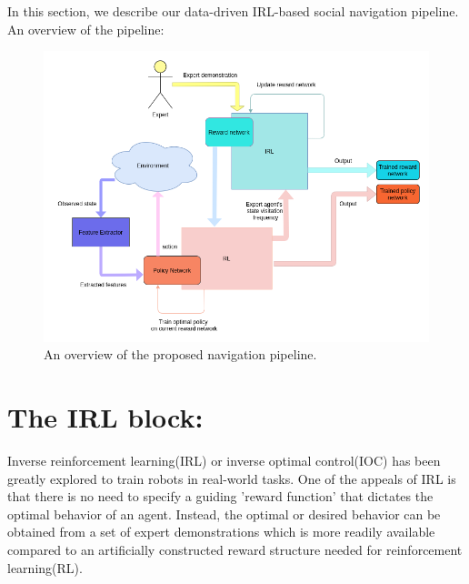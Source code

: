 \label{Ch:4}
In this section, we describe our data-driven IRL-based social navigation pipeline.\\
An overview of the pipeline:

\begin{figure}
	\centering
	\includegraphics[width=\linewidth]{figures/irl_pipeline.png}
	\caption{An overview of the proposed navigation pipeline.}
	\label{fig:irl_pipeline}
\end{figure}

\section{The IRL block:}
Inverse reinforcement learning(IRL) or inverse optimal control(IOC) has been greatly explored to train robots in real-world tasks. One of the appeals of IRL is that there is no need to specify a guiding 'reward function' that dictates the optimal behavior of an agent. Instead, the optimal or desired behavior can be obtained from a set of expert demonstrations which is more readily available compared to an artificially constructed reward structure needed for reinforcement learning(RL).

